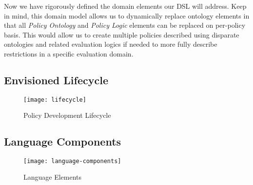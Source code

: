 Now we have rigorously defined the domain elements our DSL will address.  Keep in mind, this domain model allows us to dynamically replace ontology elements in that all \textit{Policy Ontology} and \textit{Policy Logic} elements can be replaced on per-policy basis.  This would allow us to create multiple policies described using disparate ontologies and related evaluation logics if needed to more fully describe restrictions in a specific evaluation domain.

\subsection{Envisioned Lifecycle}

\begin{figure}[!t]
\centering
\texttt{[image: lifecycle]}
\caption{Policy Development Lifecycle}
\label{fig:model:lifecycle}
\end{figure}

\subsection{Language Components}

\begin{figure}[!t]
\centering
\texttt{[image: language-components]}
\caption{Language Elements}
\label{fig:model:language-components}
\end{figure}
